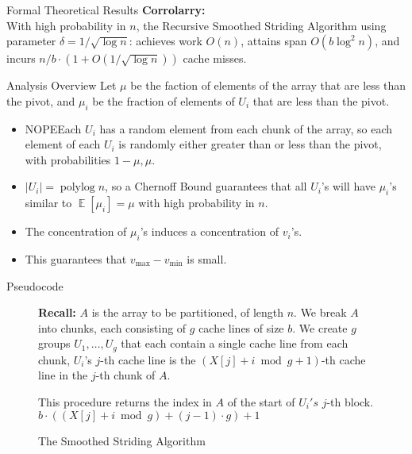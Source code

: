 \documentclass[table,serif,mathserif,final]{beamer}
\def\E{\operatorname{\mathbb{E}}}
\newcommand{\polylog}{\operatorname{polylog}}
\theoremstyle{remark}
\begin{document}
\begin{frame}{}
\begin{block}{\Huge Formal Theoretical Results }
\textbf{Corrolarry: \\}
	With high probability in $n$, the Recursive Smoothed Striding Algorithm using parameter $\delta=1/\sqrt{\log n}$:
  achieves work $O(n)$, attains span $O(b\log^2 n)$, and incurs $n/b \cdot (1 + O(1 / \sqrt{\log n}))$ cache misses. 




\end{block}
\vspace{1cm}

\begin{block}{\Huge Analysis Overview}
  \justifying
  \Huge
    Let $\mu$ be the faction of elements of the array that are less than the pivot, and $\mu_i$ be the fraction of elements of $U_i$ that are less than the pivot.
  \begin{itemize}
    \item {\color{red} NOPE}Each $U_i$ has a random element from each chunk of the array, so each
      element of each $U_i$ is randomly either greater than or less than the
      pivot, with probabilities $1-\mu, \mu$.
    \item $|U_i| = \polylog n$, so a Chernoff Bound guarantees that all $U_i$'s
      will have $\mu_i$'s similar to $\E[\mu_i] = \mu$ with high probability in $n$.
    \item The concentration of $\mu_i$'s induces a concentration of $v_i$'s. 
    \item This guarantees that $v_{\max} - v_{\min}$ is small. 
  \end{itemize}
\end{block}
\vspace{1cm}

\begin{block}{\Huge Pseudocode}
  \justifying
  \Large

\begin{figure}
  \caption{The Smoothed Striding Algorithm}
  \label{alg:parallelPartition_smoothedStriding}
  \begin{algorithmic}%
    \State \textbf{Recall:} 
    \State $A$ is the array to be partitioned, of length $n$. 
    \State We break $A$ into chunks, each consisting of $g$ cache lines of size $b$.
    \State We create $g$ groups $U_1,\ldots, U_g$ that each contain a single cache line from each chunk,
    \State $U_i$'s $j$-th cache line is the $(X[j]+i \bmod g + 1)$-th cache line in the $j$-th chunk of $A$.
    \State

      \Comment This procedure returns the index in $A$ of the start of $U_i's$ $j$-th block.
      \State\Return $b\cdot ((X[j] + i \bmod g) +(j-1)\cdot g)+1$
    \EndProcedure
    \State


\end{algorithmic}
\end{figure}
\end{block}
\end{frame}
\end{document}
